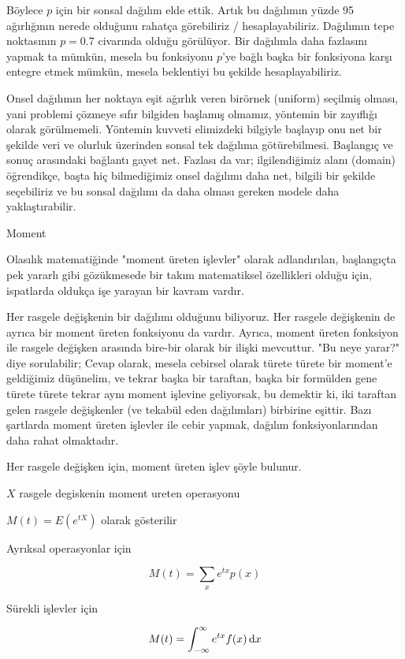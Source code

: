 \documentclass[12pt,fleqn]{article}\usepackage{../../common}
\begin{document}
Böylece $p$ için bir sonsal dağılım elde ettik. Artık bu dağılımın yüzde 95
ağırlığının nerede olduğunu rahatça görebiliriz /
hesaplayabiliriz. Dağılımın tepe noktasının $p=0.7$ civarında olduğu
görülüyor. Bir dağılımla daha fazlasını yapmak ta mümkün, mesela bu
fonksiyonu $p$'ye bağlı başka bir fonksiyona karşı entegre etmek mümkün,
mesela beklentiyi bu şekilde hesaplayabiliriz.

Onsel dağılımın her noktaya eşit ağırlık veren birörnek (uniform) seçilmiş
olması, yani problemi çözmeye sıfır bilgiden başlamış olmamız, yöntemin bir
zayıflığı olarak görülmemeli. Yöntemin kuvveti elimizdeki bilgiyle başlayıp
onu net bir şekilde veri ve olurluk üzerinden sonsal tek dağılıma
götürebilmesi. Başlangıç ve sonuç arasındaki bağlantı gayet net. Fazlası da
var; ilgilendiğimiz alanı (domain) öğrendikçe, başta hiç bilmediğimiz onsel
dağılımı daha net, bilgili bir şekilde seçebiliriz ve bu sonsal dağılımı da
daha olması gereken modele daha yaklaştırabilir. 

Moment 

Olasılık matematiğinde "moment üreten işlevler" olarak adlandırılan,
başlangıçta pek yararlı gibi gözükmesede bir takım matematiksel
özellikleri olduğu için, ispatlarda oldukça işe yarayan bir kavram
vardır.

Her rasgele değişkenin bir dağılımı olduğunu biliyoruz. Her rasgele
değişkenin de ayrıca bir moment üreten fonksiyonu da vardır. Ayrıca,
moment üreten fonksiyon ile rasgele değişken arasında bire-bir olarak
bir ilişki mevcuttur. "Bu neye yarar?" diye sorulabilir; Cevap olarak,
mesela cebirsel olarak türete türete bir moment'e geldiğimiz
düşünelim, ve tekrar başka bir taraftan, başka bir formülden gene
türete türete tekrar aynı moment işlevine geliyorsak, bu demektir ki,
iki taraftan gelen rasgele değişkenler (ve tekabül eden dağılımları)
birbirine eşittir. Bazı şartlarda moment üreten işlevler ile cebir
yapmak, dağılım fonksiyonlarından daha rahat olmaktadır.

Her rasgele değişken için, moment üreten işlev şöyle bulunur.

$X$ rasgele degiskenin moment ureten operasyonu

$M(t)=E(e^{tX})$ olarak gösterilir

Ayrıksal operasyonlar için

$$ M(t) = \sum_x e^{tx}p(x) $$

Sürekli işlevler için

$$ M(t) = \int_{-\infty}^{\infty} e^{tx}f(x) \,\mathrm{d} x   $$
\end{document}

